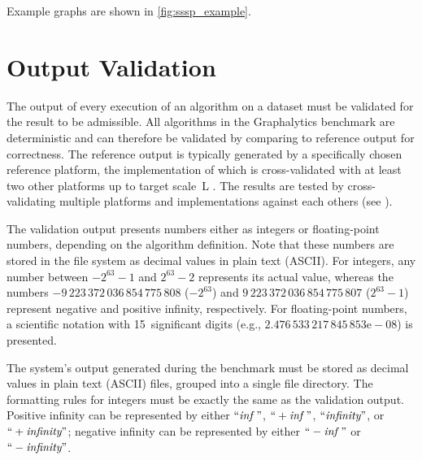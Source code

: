 Example graphs are shown in \autoref{fig:sssp_example}.




\section{Output Validation}
\label{sec:definitions_validation}

The output of every execution of an algorithm on a dataset must be validated for the result to be admissible. All algorithms in the Graphalytics benchmark are deterministic and can therefore be validated by comparing to reference output for correctness. The reference output is typically generated by a specifically chosen reference platform, the implementation of which is cross-validated with at least two other platforms up to target scale~L . The results are tested by cross-validating multiple platforms and implementations against each others (see ).

The validation output presents numbers either as integers or floating-point numbers, depending on the algorithm definition. Note that these numbers are stored in the file system as decimal values in plain text (ASCII). For integers, any number between $-2^{63}-1$ and $2^{63}-2$ represents its actual value, whereas the numbers ${-9\,223\,372\,036\,854\,775\,808}$ ($-2^{63}$) and $9\,223\,372\,036\,854\,775\,807$ ($2^{63}-1$) represent negative and positive infinity, respectively.
For floating-point numbers, a scientific notation with 15~significant digits (e.g., $2.476\,533\,217\,845\,853\mathrm{e-}08$) is presented.

The system's output generated during the benchmark must be stored as decimal values in plain text (ASCII) files, grouped into a single file directory. The formatting rules for integers must be exactly the same as the validation output. Positive infinity can be represented by either $``\textit{inf}\ "$, $``+\textit{inf}\ "$, $``\textit{infinity}"$, or $``+\textit{infinity}"$; negative infinity can be represented by either $``-\textit{inf}\ "$ or $``-\textit{infinity}"$. 



